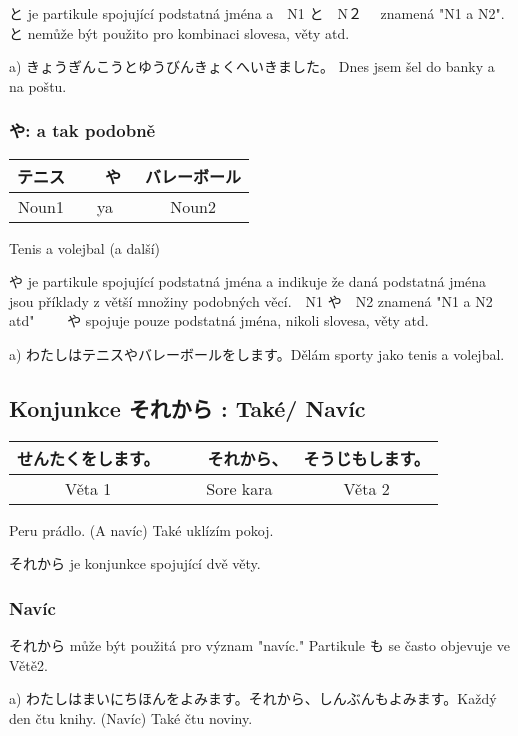 と je partikule spojující podstatná jména a　N1 と　N２　 znamená "N1 a N2". と nemůže být použito pro kombinaci slovesa, věty atd.


a) きょうぎんこうとゆうびんきょくへいきました。 Dnes jsem šel do banky a na poštu.

\subsubsection{や: a tak podobně}
\begin{center}
\begin{tabular}{||c|c|c||}
\hline
テニス&　や　&バレーボール\\
\hline
Noun1 & ya & Noun2\\
\hline
\end{tabular}
\end{center}
Tenis a volejbal (a další)

や je partikule spojující podstatná jména a indikuje že daná podstatná jména jsou příklady z větší množiny podobných věcí.　N1 や　N2 znamená "N1 a N2 atd"  　　や spojuje pouze podstatná jména, nikoli slovesa, věty atd.

a) わたしはテニスやバレーボールをします。Dělám sporty jako tenis a volejbal.



\subsection{Konjunkce それから : Také/ Navíc}
\begin{center}
\begin{tabular}{||c|c|c|c||}
\hline
せんたくをします。&&　それから、&そうじもします。\\
\hline
Věta 1 &&Sore kara&Věta 2\\
\hline
\end{tabular}
\end{center}
Peru prádlo. (A navíc) Také uklízím pokoj.

それから je konjunkce spojující dvě věty.

\subsubsection{Navíc}

それから může být použitá pro význam "navíc." Partikule も se často objevuje ve Větě2.

a) わたしはまいにちほんをよみます。それから、しんぶんもよみます。Každý den čtu knihy. (Navíc) Také čtu noviny.

